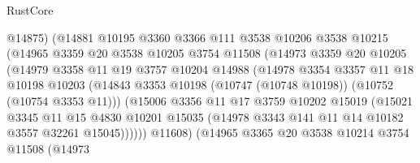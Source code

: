 \begin{lexlean}{RustCore}
\begin{coremodule}
                            @14875)
                          (@14881
                            @10195
                            @3360
                            @3366
                            @111
                            @3538
                            @10206
                            @3538
                            @10215
                            (@14965
                              @3359
                              @20
                              @3538
                              @10205
                              @3754
                              @11508
                              (@14973
                                @3359
                                @20
                                @10205
                                (@14979
                                  @3358
                                  @11
                                  @19
                                  @3757
                                  @10204
                                  @14988
                                  (@14978
                                    @3354
                                    @3357
                                    @11
                                    @18
                                    @10198
                                    @10203
                                    (@14843
                                      @3353
                                      @10198
                                      (@10747 (@10748 @10198))
                                      (@10752 (@10754 @3353 @11)))
                                    (@15006
                                      @3356
                                      @11
                                      @17
                                      @3759
                                      @10202
                                      @15019
                                      (@15021
                                        @3345
                                        @11
                                        @15
                                        @4830
                                        @10201
                                        @15035
                                        (@14978 @3343 @141 @11 @14 @10182 @3557 @32261 @15045))))))
                              @11608)
                            (@14965
                              @3365
                              @20
                              @3538
                              @10214
                              @3754
                              @11508
                              (@14973

\end{coremodule}
\end{lexlean}
